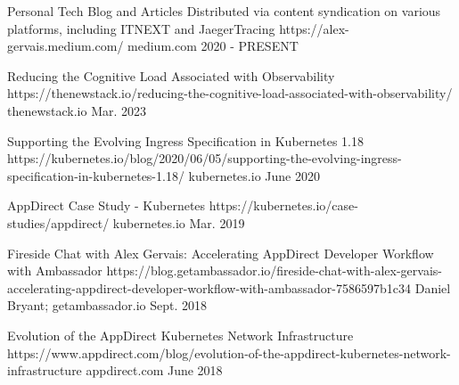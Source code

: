 

\begin{cvhonors}

  \cvhonor
    {Personal Tech Blog and Articles} %
    {Distributed via content syndication on various platforms, including ITNEXT and JaegerTracing } %
    {https://alex-gervais.medium.com/} %
    {medium.com} %
    {2020 - PRESENT} %

  \cvhonor
    {Reducing the Cognitive Load Associated with Observability} %
    {} %
    {https://thenewstack.io/reducing-the-cognitive-load-associated-with-observability/} %
    {thenewstack.io} %
    {Mar. 2023} %


  \cvhonor
    {Supporting the Evolving Ingress Specification in Kubernetes 1.18} %
    {} %
    {https://kubernetes.io/blog/2020/06/05/supporting-the-evolving-ingress-specification-in-kubernetes-1.18/} %
    {kubernetes.io} %
    {June 2020} %

  \cvhonor
    {AppDirect Case Study - Kubernetes} %
    {} %
    {https://kubernetes.io/case-studies/appdirect/} %
    {kubernetes.io} %
    {Mar. 2019} %

  \cvhonor
    {Fireside Chat with Alex Gervais: Accelerating AppDirect Developer Workflow with Ambassador} %
    {} %
    {https://blog.getambassador.io/fireside-chat-with-alex-gervais-accelerating-appdirect-developer-workflow-with-ambassador-7586597b1c34} %
    {Daniel Bryant; getambassador.io} %
    {Sept. 2018} %

  \cvhonor
    {Evolution of the AppDirect Kubernetes Network Infrastructure} %
    {} %
    {https://www.appdirect.com/blog/evolution-of-the-appdirect-kubernetes-network-infrastructure} %
    {appdirect.com} %
    {June 2018} %

\end{cvhonors}


